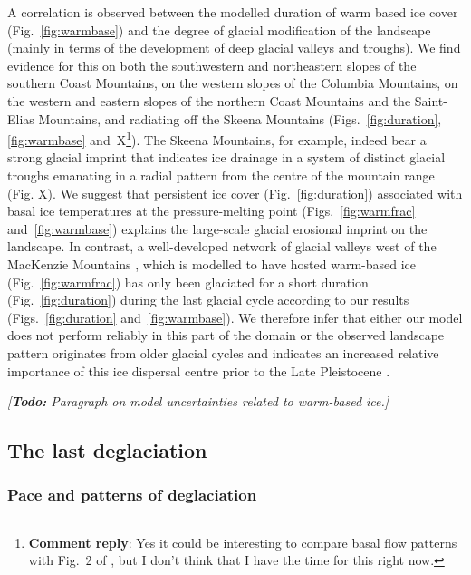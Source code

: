\documentclass[tc, manuscript]{copernicus}
\newcommand{\renote}[1]{\footnote{\textbf{Comment reply}: #1}}
\newcommand{\todo}[1]{\emph{[\textbf{Todo:} #1]}}
\begin{document}
A correlation is observed between the modelled duration of warm based ice cover
(Fig.~\ref{fig:warmbase}) and the degree of glacial modification of the
landscape (mainly in terms of the development of deep glacial valleys and
troughs). We find evidence for this on both the southwestern and northeastern
slopes of the southern Coast Mountains, on the western slopes of the Columbia
Mountains, on the western and eastern slopes of the northern Coast Mountains
and the Saint-Elias Mountains, and radiating off the Skeena Mountains
(Figs.~\ref{fig:duration}, \ref{fig:warmbase} and~X\renote{
    Yes it could be interesting to compare basal flow patterns with Fig.~2 of
    \citet{Kleman.etal.2010}, but I don't think that I have the time for this
    right now.}).
The Skeena Mountains, for example, indeed bear a strong glacial imprint that
indicates ice drainage in a system of distinct glacial troughs emanating in a
radial pattern from the centre of the mountain range (Fig. X). We suggest that
persistent ice cover (Fig.~\ref{fig:duration}) associated with basal ice
temperatures at the pressure-melting point (Figs.~\ref{fig:warmfrac}
and~\ref{fig:warmbase}) explains the large-scale glacial erosional imprint on
the landscape. In contrast, a well-developed network of glacial valleys west of
the MacKenzie Mountains \citep[Fig.~X;][]{Kleman.etal.2010,
Stroeven.etal.2010}, which is modelled to have hosted warm-based ice
(Fig.~\ref{fig:warmfrac}) has only been glaciated for a short duration
(Fig.~\ref{fig:duration}) during the last glacial cycle according to our
results (Figs.~\ref{fig:duration} and~\ref{fig:warmbase}). We therefore infer
that either our model does not perform reliably in this part of the domain or
the observed landscape pattern originates from older glacial cycles and
indicates an increased relative importance of this ice dispersal centre prior
to the Late Pleistocene \citep[cf.][]{Ward.etal.2008, Demuro.etal.2012}.

\todo{Paragraph on model uncertainties related to warm-based ice.}

\subsection{The last deglaciation}

\subsubsection{Pace and patterns of deglaciation}
\end{document}

